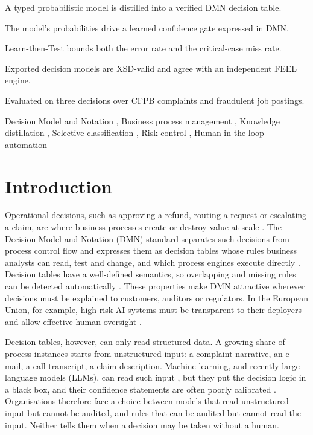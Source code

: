 \documentclass[a4paper,fleqn]{cas-sc}
\theoremstyle{definition}
\begin{document}
\begin{highlights}
\item A typed probabilistic model is distilled into a verified DMN decision table.
\item The model's probabilities drive a learned confidence gate expressed in DMN.
\item Learn-then-Test bounds both the error rate and the critical-case miss rate.
\item Exported decision models are XSD-valid and agree with an independent FEEL engine.
\item Evaluated on three decisions over CFPB complaints and fraudulent job postings.
\end{highlights}

\begin{keywords}
Decision Model and Notation \sep
Business process management \sep
Knowledge distillation \sep
Selective classification \sep
Risk control \sep
Human-in-the-loop automation
\end{keywords}

\maketitle

\section{Introduction}\label{sec:intro}

Operational decisions, such as approving a refund, routing a request or escalating a claim, are where business processes create or destroy value at scale \citep{dumas2018}. The Decision Model and Notation (DMN) standard \citep{omg_dmn13} separates such decisions from process control flow and expresses them as decision tables whose rules business analysts can read, test and change, and which process engines execute directly \citep{hasic2018,figl2018}. Decision tables have a well-defined semantics, so overlapping and missing rules can be detected automatically \citep{calvanese2016,calvanese2018}. These properties make DMN attractive wherever decisions must be explained to customers, auditors or regulators. In the European Union, for example, high-risk AI systems must be transparent to their deployers and allow effective human oversight \citep{euaiact2024}.

Decision tables, however, can only read structured data. A growing share of process instances starts from unstructured input: a complaint narrative, an e-mail, a call transcript, a claim description. Machine learning, and recently large language models (LLMs), can read such input \citep{vidgof2023}, but they put the decision logic in a black box, and their confidence statements are often poorly calibrated \citep{guo2017,xiong2024}. Organisations therefore face a choice between models that read unstructured input but cannot be audited, and rules that can be audited but cannot read the input. Neither tells them when a decision may be taken without a human.
\end{document}
